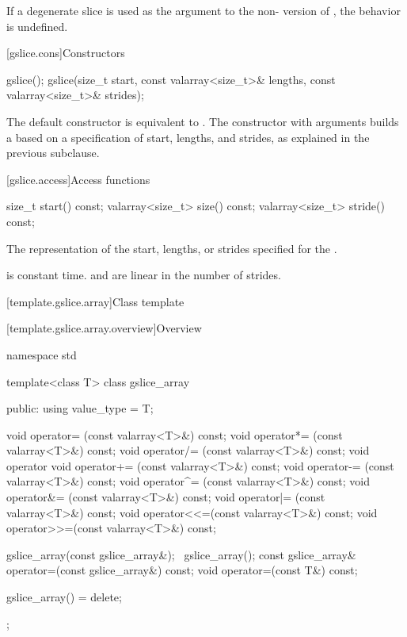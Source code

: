 \pnum
If a degenerate slice is used as the argument to the
non-
version of
,
the behavior is undefined.
%

[gslice.cons]{Constructors}

%
\begin{itemdecl}
gslice();
gslice(size_t start, const valarray<size_t>& lengths,
       const valarray<size_t>& strides);
\end{itemdecl}

\begin{itemdescr}
\pnum
The default constructor is equivalent to
.
The constructor with arguments builds a
based on a specification of start, lengths, and strides, as explained
in the previous subclause.
\end{itemdescr}

[gslice.access]{Access functions}

%
%
%
\begin{itemdecl}
size_t           start()  const;
valarray<size_t> size() const;
valarray<size_t> stride() const;
\end{itemdecl}

\begin{itemdescr}
\pnum
\returns
The representation of the
start, lengths, or strides specified for the .

\pnum
\complexity
{} is constant time.  and 
are linear in the number of strides.
\end{itemdescr}

[template.gslice.array]{Class template }

[template.gslice.array.overview]{Overview}

%
%
\begin{codeblock}
namespace std {
  template<class T> class gslice_array {
  public:
    using value_type = T;

    void operator=  (const valarray<T>&) const;
    void operator*= (const valarray<T>&) const;
    void operator/= (const valarray<T>&) const;
    void operator%
    void operator+= (const valarray<T>&) const;
    void operator-= (const valarray<T>&) const;
    void operator^= (const valarray<T>&) const;
    void operator&= (const valarray<T>&) const;
    void operator|= (const valarray<T>&) const;
    void operator<<=(const valarray<T>&) const;
    void operator>>=(const valarray<T>&) const;

    gslice_array(const gslice_array&);
    ~gslice_array();
    const gslice_array& operator=(const gslice_array&) const;
    void operator=(const T&) const;

    gslice_array() = delete;
  };
}
\end{codeblock}

